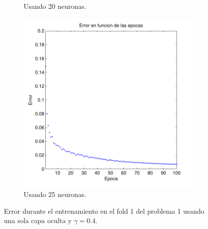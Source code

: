\documentclass[informe.tex]{subfiles}
\begin{document}
\begin{figure}[H]
\begin{subfigure}[b]{0.32\textwidth}
                \caption{Usando 20 neuronas.}
                \label{fig:d1-f1-04-n20}
        \end{subfigure}
        \begin{subfigure}[b]{0.32\textwidth}
                \includegraphics[width=\textwidth]{graficos/error_fold1_25_binary_100_04.pdf}
                \caption{Usando 25 neuronas.}
                \label{fig:d1-f1-04-n25}
        \end{subfigure}
        
        \caption{Error durante el entrenamiento en el fold 1 del problema 1 usando una sola capa oculta y $\gamma=0.4$.}\label{fig:p1-f1-gamma04}
    \end{figure}    
\end{document}
